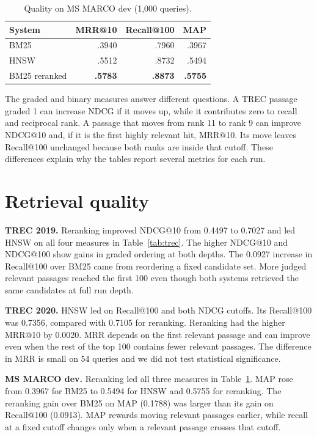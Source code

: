 \documentclass[11pt,letterpaper]{article}
\begin{document}
\begin{table}[H]
\centering\small
\caption{Quality on MS MARCO dev (1,000 queries).}
\label{tab:dev}
\begin{tabular}{@{}lrrr@{}}
\toprule
System & MRR@10 & Recall@100 & MAP\\
\midrule
BM25 & .3940 & .7960 & .3967\\
HNSW & .5512 & .8732 & .5494\\
BM25 reranked & \textbf{.5783} & \textbf{.8873} & \textbf{.5755}\\
\bottomrule
\end{tabular}
\end{table}


The graded and binary measures answer different questions. A TREC passage graded 1 can increase NDCG if it moves up, while it contributes zero to recall and reciprocal rank. A passage that moves from rank 11 to rank 9 can improve NDCG@10 and, if it is the first highly relevant hit, MRR@10. Its move leaves Recall@100 unchanged because both ranks are inside that cutoff. These differences explain why the tables report several metrics for each run.

\newpage
\section{Retrieval quality}
\textbf{TREC 2019.} Reranking improved NDCG@10 from 0.4497 to 0.7027 and led HNSW on all four measures in Table~\ref{tab:trec}. The higher NDCG@10 and NDCG@100 show gains in graded ordering at both depths. The 0.0927 increase in Recall@100 over BM25 came from reordering a fixed candidate set. More judged relevant passages reached the first 100 even though both systems retrieved the same candidates at full run depth.

\textbf{TREC 2020.} HNSW led on Recall@100 and both NDCG cutoffs. Its Recall@100 was 0.7356, compared with 0.7105 for reranking. Reranking had the higher MRR@10 by 0.0020. MRR depends on the first relevant passage and can improve even when the rest of the top 100 contains fewer relevant passages. The difference in MRR is small on 54 queries and we did not test statistical significance.

\textbf{MS MARCO dev.} Reranking led all three measures in Table~\ref{tab:dev}. MAP rose from 0.3967 for BM25 to 0.5494 for HNSW and 0.5755 for reranking. The reranking gain over BM25 on MAP (0.1788) was larger than its gain on Recall@100 (0.0913). MAP rewards moving relevant passages earlier, while recall at a fixed cutoff changes only when a relevant passage crosses that cutoff.
\end{document}
